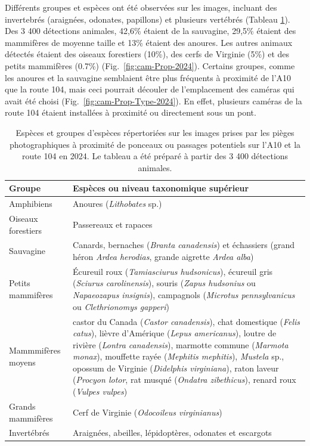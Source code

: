 Différents groupes et espèces ont été observées sur les images, incluant des invertebrés (araignées, odonates, papillons) et plusieurs vertébrés (Tableau \ref{tab:cam-sp-2024}). Des 3 400 détections animales, 42,6\% étaient de la sauvagine, 29,5\% étaient des mammifères de moyenne taille et 13\% étaient des anoures. Les autres animaux détectés étaient des oiseaux forestiers (10\%), des cerfs de Virginie (5\%) et des petits mammifères (0.7\%) (Fig.~\ref{fig:cam-Prop-2024}). Certains groupes, comme les anoures et la sauvagine semblaient être plus fréquents à proximité de l'A10 que la route 104, mais ceci pourrait découler de l'emplacement des caméras qui avait été choisi (Fig.~\ref{fig:cam-Prop-Type-2024}). En effet, plusieurs caméras de la route 104 étaient installées à proximité ou directement sous un pont.

\begin{table}[H]
  \caption{Espèces et groupes d'espèces répertoriées sur les images prises par les pièges photographiques à proximité de ponceaux ou passages potentiels sur l'A10 et la route 104 en 2024. Le tableau a été préparé à partir des 3 400 détections animales.}
  \label{tab:cam-sp-2024}
  \begin{tabular}{p{}p{}}
    \hline
    Groupe & Espèces ou niveau taxonomique supérieur \\
    \hline
    Amphibiens & Anoures (\emph{Lithobates} sp.) \\
    Oiseaux forestiers & Passereaux et rapaces \\
    Sauvagine & Canards, bernaches (\emph{Branta canadensis}) et échassiers (grand héron \emph{Ardea herodias}, grande aigrette \emph{Ardea alba}) \\
    Petits mammifères & Écureuil roux (\emph{Tamiasciurus hudsonicus}), écureuil gris (\emph{Sciurus carolinensis}), souris (\emph{Zapus hudsonius} ou \emph{Napaeozapus insignis}), campagnols (\emph{Microtus pennsylvanicus} ou \emph{Clethrionomys gapperi}) \\
    Mammmifères moyens & castor du Canada (\emph{Castor canadensis}), chat domestique (\emph{Felis catus}), lièvre d’Amérique (\emph{Lepus americanus}), loutre de rivière (\emph{Lontra canadensis}), marmotte commune (\emph{Marmota monax}), mouffette rayée (\emph{Mephitis mephitis}), \emph{Mustela} sp., opossum de Virginie (\emph{Didelphis virginiana}), raton laveur (\emph{Procyon lotor}, rat musqué (\emph{Ondatra zibethicus}), renard roux (\emph{Vulpes vulpes}) \\
    Grands mammifères & Cerf de Virginie (\emph{Odocoileus virginianus}) \\
    Invertébrés & Araignées, abeilles, lépidoptères, odonates et escargots \\
   \hline
  \end{tabular}
\end{table}


